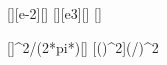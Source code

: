 [\cm][e-2][\m]
[\kilo\A][e3][\A]
[\A]

[]{\ncmuoX*\IX^2/(2*pi*\dX)}[\N\per\m]
[\left(\right)^2]{(\IX/\IoX)^2}
